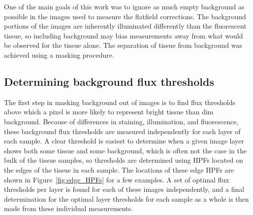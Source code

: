\documentclass[letterpaper,11pt]{article}
\newcommand{\reffig}[1]{Figure~\ref{#1}}
\begin{document}
One of the main goals of this work was to ignore as much empty background as possible in the images used to measure the flatfield corrections. The background portions of the images are inherently illuminated differently than the fluorescent tissue, so including background may bias measurements away from what would be observed for the tissue alone. The separation of tissue from background was achieved using a masking procedure.

\subsection{Determining background flux thresholds}
\label{ssec:determining_background_flux_thresholds}

The first step in masking background out of images is to find flux thresholds above which a pixel is more likely to represent bright tissue than dim background. Because of differences in staining, illumination, and fluorescence, these background flux thresholds are measured independently for each layer of each sample. A clear threshold is easiest to determine when a given image layer shows both some tissue and some background, which is often not the case in the bulk of the tissue samples, so thresholds are determined using HPFs located on the edges of the tissue in each sample. The locations of these edge HPFs are shown in \reffig{fig:edge_HPFs} for a few examples. A set of optimal flux thresholds per layer is found for each of these images independently, and a final determination for the optimal layer thresholds for each sample as a whole is then made from these individual measurements.
\end{document}
